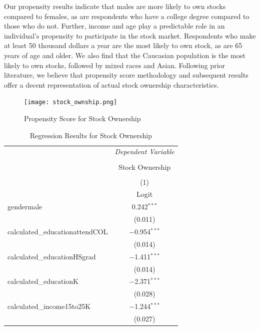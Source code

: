 \documentclass[11pt,a4paper,oldfontcommands]{memoir}
\begin{document}
{Our propensity results indicate that males are more likely to own stocks compared to females, as are respondents who have a college degree compared to those who do not. Further, income and age play a predictable role in an individual's propensity to participate in the stock market. Respondents who make at least 50 thousand dollars a year are the most likely to own stock, as are 65 years of age and older. We also find that the Caucasian population is the most likely to own stocks, followed by mixed races and Asian. Following prior literature, we believe that propensity score methodology and subsequent results offer a decent representation of actual stock ownership characteristics.

\begin{figure}[H]
\caption{Propensity Score for Stock Ownership}
\texttt{[image: stock\_ownship.png]} 
\centering
\label{fig:propensity}
\end{figure}

\begin{small}
\def\sym#1{\ifmmode^{#1}\else\(^{#1}\)\fi}
\begin{longtable}[c]{lc} 
\caption{Regression Results for Stock Ownership \label{tab:cpsrsl}} \\
\hline\hline
& \multicolumn{1}{c}{ \textit{Dependent Variable}} \\
\cline{2-2}\\[-4ex]
& \multicolumn{1}{c}{Stock Ownership}\\
\\[-4ex]
                    &\multicolumn{1}{c}{(1)}\\
                    &\multicolumn{1}{c}{Logit}\\
\hline
 gendermale & 0.242$^{***}$ \\ 
  & (0.011) \\ 
 
 calculated\_educationattendCOL & $-$0.954$^{***}$ \\ 
  & (0.014) \\ 
 
 calculated\_educationHSgrad & $-$1.411$^{***}$ \\ 
  & (0.014) \\ 
 
 calculated\_educationK & $-$2.371$^{***}$ \\ 
  & (0.028) \\ 
 
 calculated\_income15to25K & $-$1.244$^{***}$ \\ 
  & (0.027) \\ 
 

\end{longtable}
\end{small}}
\end{document}
